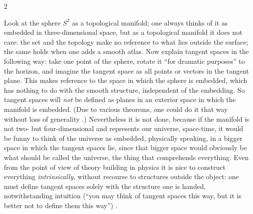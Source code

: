 \begin{paracol}{2}
\begin{intuition}\label{int:df-embedding}
Look at the sphere $S^2$ as a topological manifold; one always thinks of it as embedded in three-dimensional space, but as a topological manifold it does not care: the set and the topology make no reference to what lies outside the surface; the same holds when one adds a smooth atlas. Now explain tangent spaces in the
following way: take one point of the sphere, rotate it ``for dramatic purposes'' to the horizon, and imagine the tangent space as all points or vectors in the tangent plane. This makes reference to the space in which the sphere is embedded, which has nothing to do with the smooth structure, independent of the embedding. So tangent spaces
will \emph{not} be defined as planes in an exterior space in which the manifold is embedded. (Due to various theorems, one could do it that way without loss of generality .)
Nevertheless it is not done, because if the manifold is not two- but four-dimensional and represents our universe, space-time, it would be funny to think of the universe as embedded, physically speaking, in a bigger space in which the tangent spaces lie, since that bigger space would obviously be what should be called the universe,
the thing that comprehends everything. Even from the point of view of theory building in physics it is nice to construct everything \emph{intrinsically}, without recourse to structures outside the object: one must define tangent spaces solely with the structure one is handed, notwithstanding intuition (``you may think of tangent spaces
this way, but it is better not to define them this way'') .
\end{intuition}


\end{paracol}
